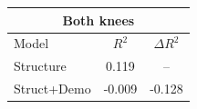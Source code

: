 \begin{tabular}{lcc}\toprule
\multicolumn{3}{c}{\textbf{Both knees}}\\\midrule
Model & $R^{2}$ & $\Delta R^{2}$\\\midrule
Structure & 0.119 & --\\
Struct+Demo & -0.009 & -0.128\\
\bottomrule\end{tabular}
